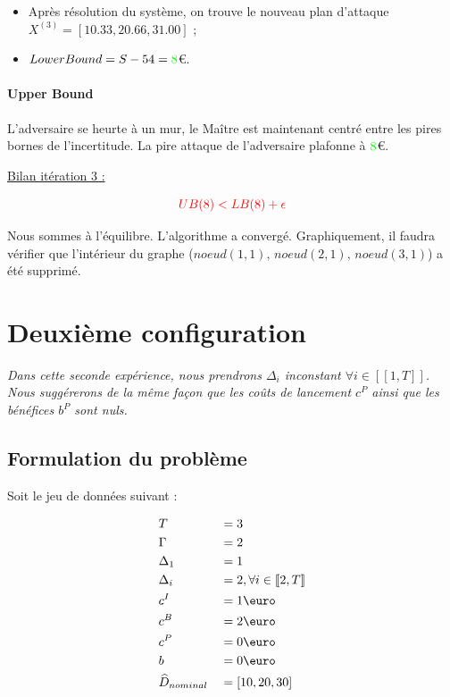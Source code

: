 \documentclass[11pt,a4paper]{article}
\begin{document}
\begin{itemize}
    \item Après résolution du système, on trouve le nouveau plan d'attaque $X^{(3)}=[10.33, 20.66, 31.00]$ ;
    \item $LowerBound=S-54=\textcolor{green}{8}$\euro.
\end{itemize}

\paragraph{Upper Bound} L'adversaire se heurte à un mur, le Maître est maintenant centré entre les pires bornes de l'incertitude. La pire attaque de l'adversaire plafonne à $\textcolor{green}{8}$\euro.

\underline{Bilan itération 3 :}

\[
    \textcolor{red}{UB(8)<LB(8)+\epsilon}
\]

Nous sommes à l'équilibre. L'algorithme a convergé. Graphiquement, il faudra vérifier que l'intérieur du graphe ($noeud(1, 1),\, noeud(2, 1),\, noeud(3, 1)$) a été supprimé.


\section{Deuxième configuration}
\label{sec:formulation2}

\textit{Dans cette seconde expérience, nous prendrons $\Delta_i$ inconstant $\forall i\in[\![1, T]\!]$. Nous suggérerons de la même façon que les coûts de lancement $c^P$ ainsi que les bénéfices $b^P$ sont nuls.}


\subsection{Formulation du problème}

Soit le jeu de données suivant :

\begin{alignat}{5}
    &T&&=3\\
    &\Gamma&&=2\\
    &\Delta_1&&=1\\
    &\Delta_i&&=2, \forall i\in[\![2, T]\!]\\
    &c^I&&=1\text{\euro}\\
    &c^B&&=2\text{\euro}\\
    &c^P&&=0\text{\euro}\\
    &b&&=0\text{\euro}\\
    &\widehat{D}_{nominal}&&=[10, 20, 30]
\end{alignat}
\end{document}
